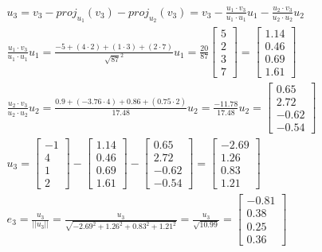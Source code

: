 \documentclass[a4paper,fleqn,12pt]{article}
\begin{document}
\begin{gather*}
u_3 = v_3 - proj_{u_1} (v_3) - proj_{u_2} (v_3) = v_3 -  \frac{u_1 \cdot v_3}{ u_1 \cdot u_1}u_1 -  \frac{u_2 \cdot v_3}{ u_2 \cdot u_2}u_2 \\
\frac{u_1 \cdot v_3}{ u_1 \cdot u_1}u_1 = \frac{-5 + (4\cdot2) + (1\cdot 3) +( 2 \cdot 7)}{\sqrt{87}^2} u_1 = \frac{20}{87}  \begin{bmatrix} 5 \\ 2 \\ 3 \\ 7   \end{bmatrix} =  
 \begin{bmatrix} 1.14 \\ 0.46 \\ 0.69 \\ 1.61  \end{bmatrix} \\
\frac{u_2 \cdot v_3}{ u_2 \cdot u_2}u_2 = \frac{0.9 + (-3.76 \cdot 4) + 0.86 + (0.75 \cdot 2)}{17.48}u_2 = \frac{-11.78}{17.48}u_2 = 
\begin{bmatrix} 0.65 \\ 2.72 \\ -0.62 \\ -0.54   \end{bmatrix}\\
u_3 = \begin{bmatrix} -1\\ 4 \\ 1 \\ 2 \end{bmatrix} - \begin{bmatrix} 1.14 \\ 0.46 \\ 0.69 \\ 1.61  \end{bmatrix}  - \begin{bmatrix} 0.65 \\ 2.72 \\ -0.62 \\ -0.54   \end{bmatrix} = 
\begin{bmatrix}- 2.69 \\ 1.26 \\ 0.83 \\1.21   \end{bmatrix} \\
e_3 = \frac{u_3}{|| u_3 ||} = \frac{u_3}{\sqrt{-2.69^2 + 1.26^2 + 0.83^2 + 1.21^2}}= \frac{u_3}{\sqrt{10.99}} = \begin{bmatrix} - 0.81 \\ 0.38 \\ 0.25 \\ 0.36  \end{bmatrix}
\end{gather*}
\end{document}

